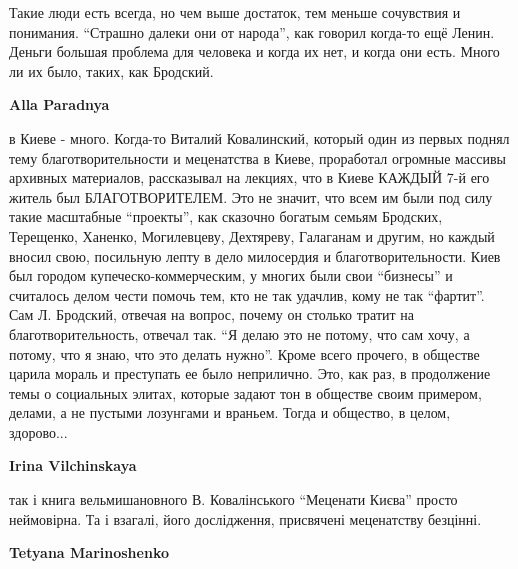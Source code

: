  
 
 
 
 
\zzSecCmt

\begin{itemize} %

Такие люди есть всегда, но чем выше достаток, тем меньше сочувствия и
понимания. \enquote{Страшно далеки они от народа}, как говорил когда-то ещё
Ленин.  Деньги большая проблема для человека и когда их нет, и когда они есть.
Много ли их было, таких, как Бродский.

\begin{itemize} %
\textbf{Alla Paradnya} 

в Киеве - много. Когда-то Виталий Ковалинский, который один из первых поднял
тему благотворительности и меценатства в Киеве, проработал огромные массивы
архивных материалов, рассказывал на лекциях, что в Киеве КАЖДЫЙ 7-й его житель
был БЛАГОТВОРИТЕЛЕМ. Это не значит, что всем им были под силу такие масштабные
\enquote{проекты}, как сказочно богатым семьям Бродских, Терещенко, Ханенко,
Могилевцеву, Дехтяреву, Галаганам и другим, но каждый вносил свою, посильную
лепту в дело милосердия и благотворительности. Киев был городом
купеческо-коммерческим, у многих были свои \enquote{бизнесы} и считалось делом чести
помочь тем, кто не так удачлив, кому не так \enquote{фартит}. Сам Л. Бродский, отвечая
на вопрос, почему он столько тратит на благотворительность, отвечал так. \enquote{Я
делаю это не потому, что сам хочу, а потому, что я знаю, что это делать нужно}.
Кроме всего прочего, в обществе царила мораль и преступать ее было неприлично.
Это, как раз, в продолжение темы о социальных элитах, которые задают тон в
обществе своим примером, делами, а не пустыми лозунгами и враньем. Тогда и
общество, в целом, здорово...

\begin{itemize} %
\textbf{Irina Vilchinskaya} 

так і книга вельмишановного В. Ковалінського \enquote{Меценати Києва} просто
неймовірна. Та і взагалі, його дослідження, присвячені меценатству безцінні.

\textbf{Tetyana Marinoshenko} 


\end{itemize}
\end{itemize}
\end{itemize}
